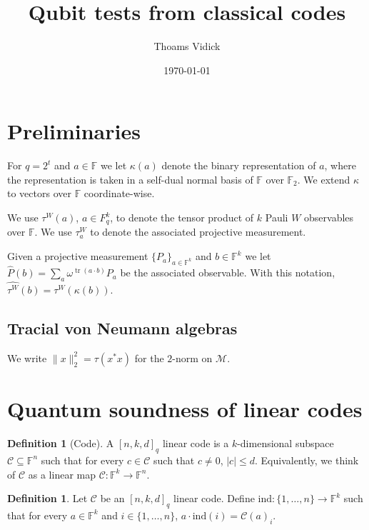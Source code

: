 \documentclass[11pt]{article}
\theoremstyle{definition}
\newtheorem{definition}[theorem]{Definition}
\newcommand{\code}{\mathcal{C}}
\newcommand{\field}{\mathbb{F}}
\newcommand{\F}{\ensuremath{\mathbb{F}}}
\newcommand{\mM}{\ensuremath{\mathcal{M}}}
\newcommand{\ind}{\ensuremath{\mathrm{ind}}}
\DeclareMathOperator{\tr}{tr}
\begin{document}
\title{Qubit tests from classical codes}

\author{Thoams Vidick}
\date{\today}
\maketitle

\noteswarning


\begin{abstract}

\end{abstract}

	\section{Preliminaries}
	
	For $q=2^t$ and $a\in \field$ we let $\kappa(a)$ denote the binary representation of $a$, where the representation is taken in a self-dual normal basis of $\field$ over $\F_2$. We extend $\kappa$ to vectors over $\field$ coordinate-wise.
	
	We use $\tau^W(a)$, $a\in F_q^k$, to denote the tensor product of $k$ Pauli $W$ observables over $\field$. We use $\tau^W_a$ to denote the associated projective measurement. 
	
	Given a projective measurement $\{P_a\}_{a\in \field^k}$ and $b\in \field^k$ we let $\widehat{P}(b) = \sum_a \omega^{\tr(a\cdot b)} P_a$ be the associated observable. With this notation, $\widehat{\tau^W}(b)=\tau^W(\kappa(b))$.
	
	\subsection{Tracial von Neumann algebras}
	
	We write $\|x\|_2^2=\tau(x^*x)$ for the $2$-norm on $\mM$.
	
\section{Quantum soundness of linear codes}

\begin{definition}[Code]
A $[n,k,d]_q$ linear code is a $k$-dimensional subspace $\code\subseteq \field^n$ such that for every $c\in \code$ such that $c\neq 0$, $|c|\leq d$. Equivalently, we think of $\code$ as a linear map $\code:\field^k\to \field^n$. 
\end{definition}

\begin{definition}
Let $\code$ be an $[n,k,d]_q$ linear code. Define $\ind:\{1,\ldots,n\}\to \field^k$ such that for every $a\in \field^k$ and $i\in\{1,\ldots,n\}$, $a\cdot \ind(i) = \code(a)_i$.
\end{definition}
\end{document}
